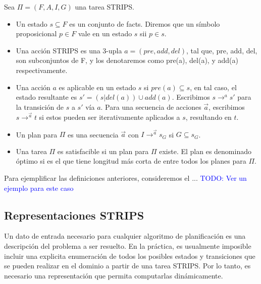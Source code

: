\begin{mydef}
    Sea $\Pi = (F, A, I, G)$ una tarea STRIPS.
    
    \begin{itemize}
        \item Un estado $s \subseteq F$ es un conjunto de facts. Diremos que un
        símbolo proposicional $p \in F$ vale en un estado $s$ sii $p \in s$.
        
        \item Una acción STRIPS es una 3-upla $a = (pre, add, del)$, tal que,
        pre, add, del, son subconjuntos de F, y los denotaremos como pre(a),
        del(a), y add(a) respectivamente.

        \item Una acción $a$ es aplicable en un estado $s$ si $pre(a) \subseteq
        s$, en tal caso, el estado resultante es $s' = (s \rvert del(a)) \cup
        add(a)$. Escribimos $s \rightarrow^a s'$ para la transición de $s$ a
        $s'$ vía $a$. Para una secuencia de acciones $\vec{a}$, escribimos $s
        \rightarrow^{\vec{a}} t$ si estos pueden ser iterativamente aplicados a
        $s$, resultando en $t$.

        \item Un plan para $\Pi$ es una secuencia $\vec{a}$ con $I
        \rightarrow^{\vec{a}} s_G$ si $G \subseteq s_G$.
        
        \item Una tarea $\Pi$ es satisfacible si un plan para $\Pi$ existe. El
        plan es denominado óptimo si es el que tiene longitud más corta de entre
        todos los planes para $\Pi$.
    \end{itemize}
\end{mydef}

Para ejemplificar las definiciones anteriores, consideremos el ...
\textcolor{blue}{TODO: Ver un ejemplo para este caso}

\subsection{Representaciones STRIPS}

Un dato de entrada necesario para cualquier algoritmo de planificación es una
descripción del problema a ser resuelto. En la práctica, es usualmente imposible
incluir una explicita enumeración de todos los posibles estados y transiciones
que se pueden realizar en el dominio a partir de una tarea STRIPS. Por lo tanto,
es necesario una representación que permita computarlas dinámicamente.

